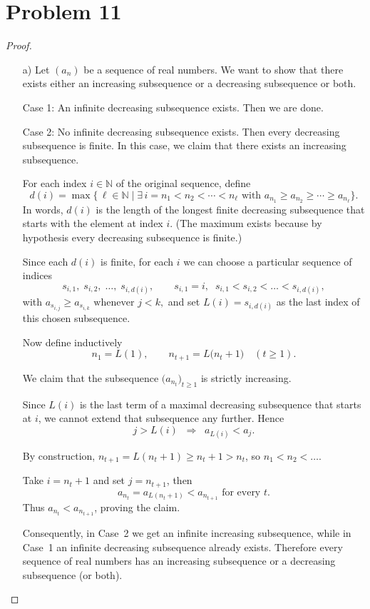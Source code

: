 \documentclass[11pt]{article}
\renewcommand{\_}[1]{\underline{ #1 }}
\theoremstyle{definition}
\numberwithin{equation}{subsection}
\begin{document}
\section*{Problem 11}
\begin{proof}
\begin{enumerate}
    \item[a)] Let $(a_n)$ be a sequence of real numbers. We want to show that there exists either an increasing subsequence or a decreasing subsequence or both.

Case 1: An infinite decreasing subsequence exists.  Then we are done.

Case 2: No infinite decreasing subsequence exists.  
Then every decreasing subsequence is finite.  
In this case, we claim that there exists an increasing subsequence. 

For each index $i \in \mathbb{N}$ of the original sequence, define
\[
  d(i)
  =
  \max\bigl\{\,\ell\in\mathbb{N} \mid
    \exists\,i=n_1<n_2<\cdots<n_\ell\text{ with }a_{n_1}\ge a_{n_2}\ge\cdots\ge a_{n_\ell}
  \bigr\}.
\]
In words, $d(i)$ is the length of the longest finite decreasing subsequence that starts with the element at index $i$.
(The maximum exists because by hypothesis every decreasing subsequence is finite.)

Since each $d(i)$ is finite, for each $i$ we can choose a particular sequence of indices
\[
  s_{i,1},\;s_{i,2},\;\dots,\;s_{i,d(i)},\qquad
  s_{i,1}=i,\;\;s_{i,1}<s_{i,2}<\dots<s_{i,d(i)},
\]
with 
\(
  a_{s_{i,j}}\ge a_{s_{i,k}}\text{ whenever }j<k,
\)
and set  $L(i)=s_{i,d(i)}$
as the last index of this chosen subsequence.

Now define inductively
\[
  n_1 = L(1),
  \qquad
  n_{t+1} = L\bigl(n_t + 1\bigr)
  \quad (t\ge 1).
\]

We claim that the subsequence $\bigl(a_{n_t}\bigr)_{t\ge1}$ is strictly increasing.

Since $L(i)$ is the last term of a maximal decreasing subsequence that starts at $i$, we cannot extend that subsequence any further.
Hence  
\[
  j > L(i)
  \;\;\Longrightarrow\;\;
  a_{L(i)} < a_j.
\]

By construction, $n_{t+1}=L(n_t+1)\ge n_t+1>n_t$, so $n_1<n_2<\dots$.

Take $i = n_t+1$ and set $j=n_{t+1}$, then
\[
  a_{n_t} = a_{L(n_t+1)} < a_{n_{t+1}}\text{ for every }t.
\]
Thus $a_{n_t}<a_{n_{t+1}}$, proving the claim.

\medskip
\noindent
Consequently, in Case~2 we get an infinite increasing subsequence, while in Case~1 an infinite decreasing subsequence already exists.  
Therefore every sequence of real numbers has an increasing subsequence or a decreasing subsequence (or both).


\end{enumerate}
\end{proof}
\end{document}
